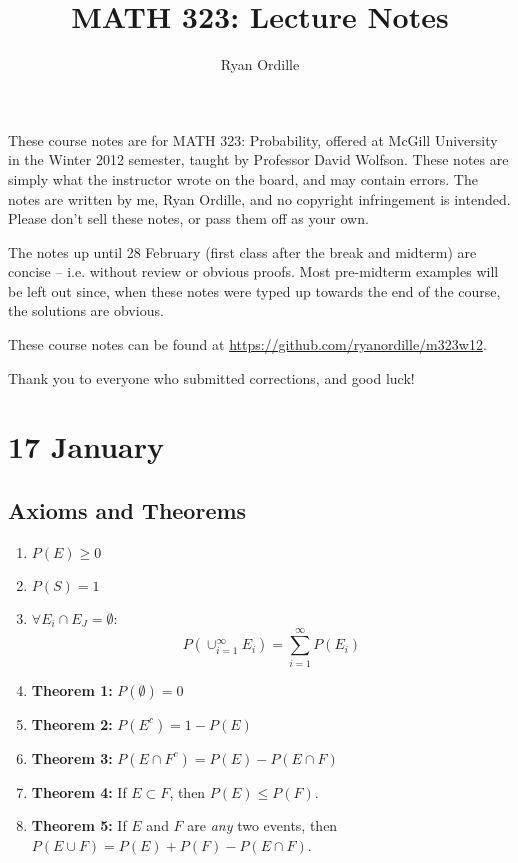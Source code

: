 \documentclass[12pt]{article}
\title{MATH 323: Lecture Notes}
\author{Ryan Ordille}
\begin{document}
\maketitle
\date{}

\pagestyle{myheadings}
These course notes are for MATH 323: Probability, offered at McGill University in the Winter 2012 semester, taught by Professor David Wolfson. These notes are simply what the instructor wrote on the board, and may contain errors. The notes are written by me, Ryan Ordille, and no copyright infringement is intended. Please don't sell these notes, or pass them off as your own. 

The notes up until 28 February (first class after the break and midterm) are concise -- i.e. without review or obvious proofs. Most pre-midterm examples will be left out since, when these notes were typed up towards the end of the course, the solutions are obvious.

These course notes can be found at \url{https://github.com/ryanordille/m323w12}.

Thank you to everyone who submitted corrections, and good luck!

\section{17 January}
\subsection{Axioms and Theorems}
\begin{enumerate}
    \item $P(E) \geq 0$
    \item $P(S) = 1$
    \item $\forall E_i \cap E_J = \emptyset$:
        \[
            P(\cup_{i=1}^{\infty} E_i) = \sum_{i=1}^{\infty} P(E_i)
        \]
    \item \textbf{Theorem 1:} $P(\emptyset) = 0$
    \item \textbf{Theorem 2:} $P(E^c) = 1 - P(E)$
    \item \textbf{Theorem 3:} $P(E \cap F^c) = P(E) - P(E \cap F)$
    \item \textbf{Theorem 4:} If $E \subset F$, then $P(E) \leq P(F)$.
    \item \textbf{Theorem 5:} If $E$ and $F$ are \emph{any} two events, then $P(E \cup F) = P(E) + P(F) - P(E \cap F)$.
\end{enumerate}
\end{document}
